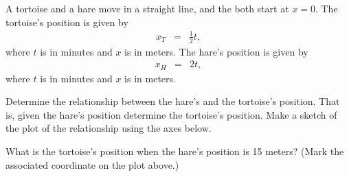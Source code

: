 
\begin{problem}
\item A tortoise and a hare move in a straight line, and the both
  start at $x=0$. The tortoise's position is given by
  \begin{eqnarray*}
    x_T & = & \frac{1}{2} t,
  \end{eqnarray*}
  where $t$ is in minutes and $x$ is in meters.  The hare's position
  is given by
  \begin{eqnarray*}
    x_H & = & 2 t,
  \end{eqnarray*}
  where $t$ is in minutes and $x$ is in meters.

  Determine the relationship between the hare's and the tortoise's
  position. That is, given the hare's position determine the
  tortoise's position. Make a sketch of the plot of the relationship using the axes below.

  \hspace*{-6em}
    \scalebox{0.95}{}


    What is the tortoise's position when the hare's position is 15
    meters? (Mark the associated coordinate on the plot above.)


\end{problem}


